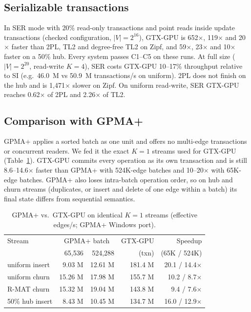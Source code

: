 \documentclass[sigconf,nonacm]{acmart}
\newcommand{\sys}{GTX-GPU}
\begin{document}
\subsection{Serializable transactions}
In SER mode with 20\% read-only transactions and point reads inside update transactions (checked configuration,
$|V|{=}2^{16}$), \sys{} is 652$\times$, 119$\times$ and 20$\times$ faster than 2PL, TL2 and degree-free TL2 on Zipf,
and 59$\times$, 23$\times$ and 10$\times$ faster on a 50\% hub. Every system passes C1--C5 on these runs. At full size
($|V|{=}2^{20}$, read-write $K{=}4$), SER costs \sys{} 10--17\% throughput relative to SI (e.g.\ 46.0~M vs 50.9~M
transactions/s on uniform). 2PL does not finish on the hub and is 1,471$\times$ slower on Zipf. On uniform
read-write, SER \sys{} reaches 0.62$\times$ of 2PL and 2.26$\times$ of TL2.

\subsection{Comparison with GPMA+}
GPMA+ applies a sorted batch as one unit and offers no multi-edge transactions or concurrent readers. We fed it the
exact $K{=}1$ streams used for \sys{} (Table~\ref{tab:gpma}). \sys{} commits every operation as its own transaction
and is still 8.6--14.6$\times$ faster than GPMA+ with 524K-edge batches and 10--20$\times$ with 65K-edge batches.
GPMA+ also loses intra-batch operation order, so on hub and churn streams (duplicates, or insert and delete of one
edge within a batch) its final state differs from sequential semantics.

\begin{table}[t]
\caption{GPMA+ vs.\ \sys{} on identical $K{=}1$ streams (effective edges/s; GPMA+ Windows port).}
\label{tab:gpma}
\footnotesize
\setlength{\tabcolsep}{3pt}
\begin{tabular}{@{}lrrrr@{}}
\toprule
Stream & \multicolumn{2}{c}{GPMA+ batch} & \sys{} & Speedup \\
 & 65,536 & 524,288 & (txn) & (65K / 524K) \\
\midrule
uniform insert & 9.03 M & 12.61 M & 181.4 M & 20.1 / 14.4$\times$ \\
uniform churn & 15.26 M & 17.98 M & 155.7 M & 10.2 / 8.7$\times$ \\
R-MAT churn & 15.32 M & 19.04 M & 143.8 M & 9.4 / 7.6$\times$ \\
50\% hub insert & 8.43 M & 10.45 M & 134.7 M & 16.0 / 12.9$\times$ \\
\bottomrule
\end{tabular}
\end{table}
\end{document}
